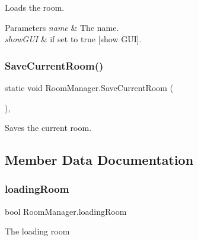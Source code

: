 Loads the room. 


\begin{DoxyParams}{Parameters}
{\em name} & The name.\\
\hline
{\em show\+G\+UI} & if set to {\ttfamily true} \mbox{[}show G\+UI\mbox{]}.\\
\hline
\end{DoxyParams}
\mbox{\label{class_room_manager_aeb1c332336581a9f2f8347871a8b86ce}} 
\subsubsection{\texorpdfstring{Save\+Current\+Room()}{SaveCurrentRoom()}}
{\footnotesize\ttfamily static void Room\+Manager.\+Save\+Current\+Room (\begin{DoxyParamCaption}{ }\end{DoxyParamCaption})\hspace{0.3cm}{\ttfamily [inline]}, {\ttfamily [static]}}



Saves the current room. 



\subsection{Member Data Documentation}
\mbox{\label{class_room_manager_a7d1d76518301470913338347a00c5805}} 
\subsubsection{\texorpdfstring{loading\+Room}{loadingRoom}}
{\footnotesize\ttfamily bool Room\+Manager.\+loading\+Room\hspace{0.3cm}{\ttfamily [static]}}



The loading room 

\mbox{\label{class_room_manager_a4932fea636739c5698e320bbe38beee6}} 
